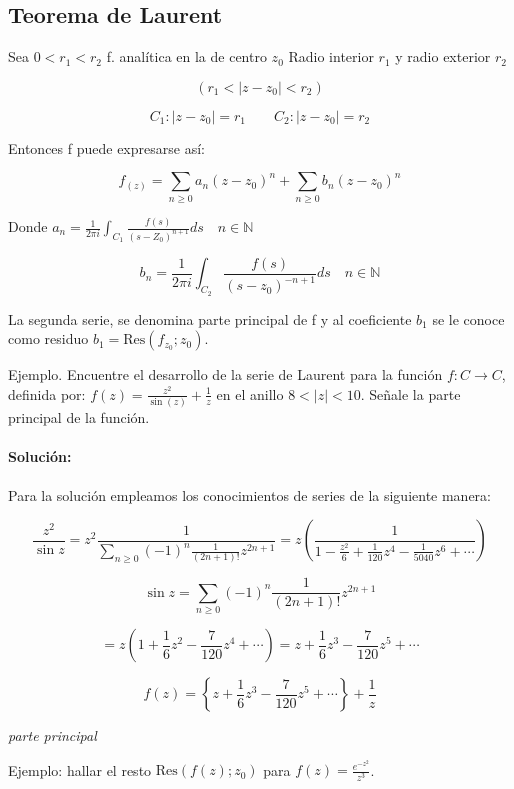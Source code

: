 \documentclass[a4paper,12pt]{article}
\begin{document}
\subsection{Teorema de Laurent}

Sea $0 < r_1 < r_2$ f. analítica en la de centro $z_0$ Radio interior $r_1$ y radio exterior $r_2$

\[
(r_1 < |z - z_0| < r_2)
\]

\[
C_1: |z - z_0| = r_1 \quad \quad C_2: |z - z_0| = r_2
\]

Entonces f puede expresarse así:

\[
f_{(z)} = \sum_{n \geq 0} a_n (z - z_0)^n + \sum_{n \geq 0} b_n (z - z_0)^n
\]

Donde $a_n = \frac{1}{2\pi i} \int_{C_1} \frac{f(s)}{(s - Z_0)^{n+1}} ds \quad n \in \mathbb{N}$

\[
b_n = \frac{1}{2\pi i} \int_{C_2} \frac{f(s)}{(s - z_0)^{-n+1}} ds \quad n \in \mathbb{N}
\]

La segunda serie, se denomina parte principal de f y al coeficiente $b_1$ se le conoce como residuo $b_1 = \text{Res}(f_{z_0}; z_0)$.

Ejemplo. Encuentre el desarrollo de la serie de Laurent para la función $f: C \rightarrow C$, definida por: $f(z) = \frac{z^2}{\sin(z)} + \frac{1}{z}$ en el anillo $8 < |z| < 10$. Señale la parte principal de la función.

\paragraph{Solución:}

Para la solución empleamos los conocimientos de series de la siguiente manera:


\[
\frac{z^2}{\sin z} = z^2 \frac{1}{\sum_{n \geq 0} (-1)^n \frac{1}{(2n + 1)!} z^{2n + 1}} = z \left( \frac{1}{1 - \frac{z^2}{6} + \frac{1}{120} z^4 - \frac{1}{5040} z^6 + \cdots} \right)
\]

\[
\sin z = \sum_{n \geq 0} (-1)^n \frac{1}{(2n + 1)!} z^{2n + 1}
\]

\[
= z \left( 1 + \frac{1}{6} z^2 - \frac{7}{120} z^4 + \cdots \right) = z + \frac{1}{6} z^3 - \frac{7}{120} z^5 + \cdots
\]

\[
f(z) = \left\{ z + \frac{1}{6} z^3 - \frac{7}{120} z^5 + \cdots \right\} + \frac{1}{z}
\]

\textit{parte principal}

Ejemplo: hallar el resto $\text{Res} (f(z); z_0)$ para $f(z) = \frac{e^{-z^2}}{z^3}$.
\end{document}
